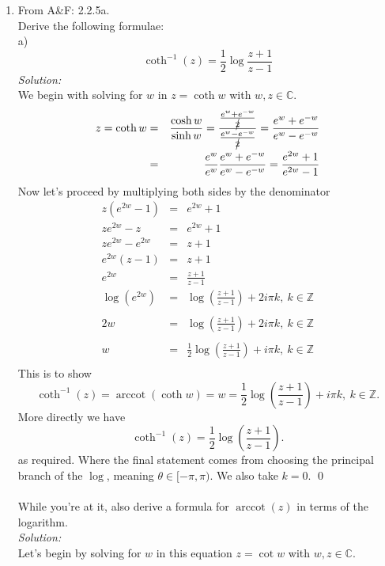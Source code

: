 \documentclass[10pt]{amsart}
\theoremstyle{nonumberplain}
\begin{document}
\begin{enumerate}[label={\bf {\arabic*}:}]
\item From A\&F: 2.2.5a. \\
Derive the following formulae: \\
a) $$\coth^{-1}(z) = \frac{1}{2}\log\frac{z + 1}{z - 1}$$
\textit{Solution:} \\
We begin with solving for $w$ in $z = \coth{w}$ with $w, z \in \mathbb{C}$. 
\begin{eqnarray*}
z = \coth{w} &=& \frac{\cosh w}{\sinh w} = \frac{ \frac{e^{w} + e^{-w}}{\cancel{2}} }{ \frac{e^{w} - e^{-w}}{\cancel{2}} } = \frac{ e^{w} + e^{-w} }{ e^{w} - e^{-w} } \\
	  &=& \frac{e^{w}}{e^{w}} \frac{ e^{w} + e^{-w} }{ e^{w} - e^{-w} } = \frac{ e^{2w} + 1}{ e^{2w} - 1 }
\end{eqnarray*}
Now let's proceed by multiplying both sides by the denominator
\begin{eqnarray*}
z\left( e^{2w} - 1\right) &=&  e^{2w} + 1\\
ze^{2w} - z &=&  e^{2w} + 1\\
ze^{2w} - e^{2w} &=& z + 1\\
e^{2w}(z - 1) &=& z + 1\\
e^{2w} &=& \frac{z + 1}{z - 1 }\\
\log \left(e^{2w}\right) &=& \log \left(\frac{z + 1}{z - 1} \right) + 2i\pi k, \: k \in \mathbb{Z} \\ \\
2w &=& \log \left(\frac{z + 1}{z - 1} \right) + 2i\pi k, \: k \in \mathbb{Z} \\ \\
w &=& \frac{1}{2}\log \left(\frac{z + 1}{z - 1} \right) + i\pi k, \: k \in \mathbb{Z} \\
\end{eqnarray*}
This is to show
$$\coth^{-1}(z) = \operatorname{arccot}(\coth w) = w = \frac{1}{2}\log \left(\frac{z + 1}{z - 1} \right) + i\pi k, \: k \in \mathbb{Z}.$$
More directly we have 
$$\coth^{-1}(z) = \frac{1}{2}\log \left(\frac{z + 1}{z - 1} \right).$$
as required.
Where the final statement comes from choosing the principal branch of the $\log$, meaning $\theta \in [-\pi, \pi)$.
We also take $k = 0$.
\qed \\
\\
While you're at it, also derive a formula for $\operatorname{arccot}(z)$ in terms of the logarithm. \\
\textit{Solution:} \\
Let's begin by solving for $w$ in this equation $z = \cot w$ with $w, z \in \mathbb{C}$.

\end{enumerate}
\end{document}
